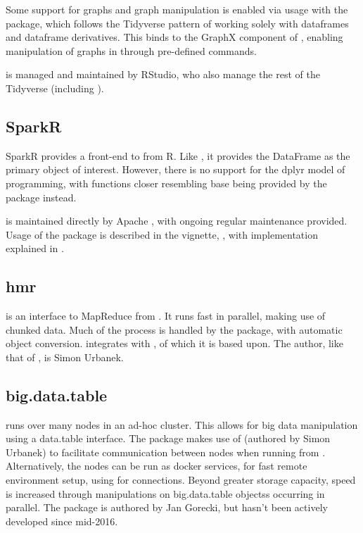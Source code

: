 Some support for graphs and graph manipulation is enabled via usage with
the  package, which follows the Tidyverse pattern of
working solely with dataframes and dataframe derivatives\cite{kuo18}.
This binds to the GraphX component of , enabling manipulation of
graphs in  through pre-defined commands.

 is managed and maintained by RStudio, who also manage the rest
of the Tidyverse (including ).

\subsection{SparkR}\label{subsec:sparkr}

SparkR provides a front-end to  from
R\cite{venkataraman20:_spark}. Like , it provides the DataFrame
as the primary object of interest. However, there is no support for the
dplyr model of programming, with functions closer resembling base \R{}
being provided by the package instead.

 is maintained directly by Apache , with ongoing regular
maintenance provided. Usage of the package is described in the vignette,
\textcite{venktaraman19:spark-pract-guide}, with implementation
explained in \cite{venkataraman2016sparkr}.

\subsection{hmr}\label{subsec:hmr}

 is an interface to MapReduce from \R{}\cite{urbanek20}. It runs
fast in parallel, making use of chunked data. Much of the process is handled by the
package, with automatic \R{} object conversion.  integrates with
, of which it is based upon. The author, like that of , is
Simon Urbanek.

\subsection{big.data.table}\label{subsec:big.data.table}

 runs  over many nodes in an ad-hoc
cluster\cite{gorecki16}. This allows for big data manipulation using a
data.table interface. The package makes use of  (authored by Simon
Urbanek) to facilitate communication between nodes when running from \R{}.
Alternatively, the nodes can be run as docker services, for fast remote
environment setup, using  for connections. Beyond greater
storage capacity, speed is increased through manipulations on
big.data.table objectss occurring in parallel. The package is authored by Jan
Gorecki, but hasn't been actively developed since mid-2016.
